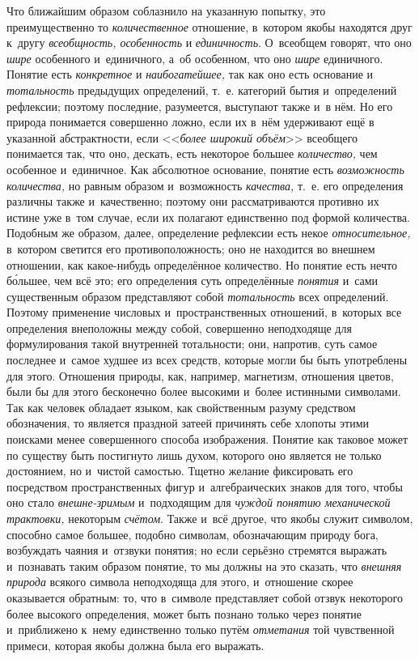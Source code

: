 Что ближайшим образом соблазнило на указанную попытку, это
преимущественно то {\em количественное}
отношение, в~котором якобы находятся друг к~другу
{\em всеобщность, особенность} и {\em единичность}.
О~всеобщем говорят, что оно {\em шире}
особенного и~единичного, а~об особенном, что оно
{\em шире} единичного. Понятие есть {\em конкретное}
и {\em наибогатейшее,} так как оно есть основание и {\em тотальность}
предыдущих определений, т.~е. категорий бытия и~определений
рефлексии; поэтому последние, разумеется, выступают также и~в нём. Но его
природа понимается совершенно ложно, если их в~нём удерживают ещё в
указанной абстрактности, если <<{\em более широкий объём}>>
всеобщего понимается так, что оно, дескать, есть некоторое
большее {\em количество,} чем особенное и~единичное. Как абсолютное
основание, понятие есть {\em возможность количества,}
но равным образом и~возможность {\em качества,} т.~е. его
определения различны также и~качественно; поэтому они рассматриваются
противно их истине уже в~том случае, если их полагают единственно под
формой количества. Подобным же образом, далее, определение рефлексии есть
некое {\em относительное,}
в~котором светится его противоположность; оно не находится во
внешнем отношении, как какое-нибудь определённое количество. Но понятие
есть нечто б\'{о}льшее, чем всё это; его определения суть определённые
{\em понятия} и~сами существенным образом представляют собой {\em тотальность}
всех определений. Поэтому применение числовых и~пространственных отношений,
в~которых все определения внеположны между собой, совершенно неподходяще для
формулирования такой внутренней тотальности; они, напротив, суть самое
последнее и~самое худшее из всех средств, которые могли бы быть употреблены
для этого. Отношения природы, как, например, магнетизм, отношения цветов,
были бы для этого бесконечно более высокими и~более истинными символами.
Так как человек обладает языком, как свойственным разуму средством
обозначения, то является праздной затеей причинять себе
хлопоты этими поисками менее совершенного способа изображения. Понятие как
таковое может по существу быть постигнуто лишь духом, которого оно является
не только достоянием, но и~чистой самостью. Тщетно желание фиксировать его
посредством пространственных фигур и~алгебраических знаков для того, чтобы
оно стало {\em внешне-зримым} и~подходящим для {\em чуждой понятию
механической трактовки,} некоторым {\em счётом}. Также и~всё
другое, что якобы служит символом, способно самое большее, подобно
символам, обозначающим природу бога, возбуждать чаяния и~отзвуки понятия;
но если серьёзно стремятся выражать и~познавать таким образом понятие, то
мы должны на это сказать, что {\em внешняя природа}
всякого символа неподходяща для этого, и~отношение скорее
оказывается обратным: то, что в~символе представляет собой отзвук
некоторого более высокого определения, может быть познано только через
понятие и~приближено к~нему единственно только путём {\em отметания} той
чувственной примеси, которая якобы должна была его выражать.

